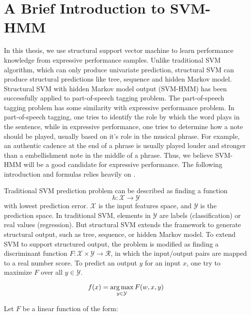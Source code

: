 \section{A Brief Introduction to SVM-HMM}
\label{sec:svm-hmm}
In this thesis, we use structural support vector machine to learn performance knowledge from expressive performance samples. Unlike traditional SVM algorithm, which can only produce univariate prediction, structural SVM can produce structural predictions like tree, sequence and hidden Markov model. Structural SVM with hidden Markov model output (SVM-HMM) has been successfully applied to part-of-speech tagging problem\cite{svm2009}. The part-of-speech tagging problem has some similarity with expressive performance problem. In part-of-speech tagging, one tries to identify the role by which the word plays in the sentence, while in expressive performance, one tries to determine how a note should be played, usually based on it's role in the musical phrase. For example, an authentic cadence at the end of a phrase is usually played louder and stronger than a embellishment note in the middle of a phrase. Thus, we believe SVM-HMM will be a good candidate for expressive performance. The following introduction and formulas relies heavily on \cite{svm2009, svm2005, svm2003}.


Traditional SVM prediction problem can be described as finding a function 
$$h: \mathcal{X \rightarrow Y}$$ with lowest prediction error. $\mathcal{X}$ is the input features space, and $\mathcal{Y}$ is the prediction space. In traditional SVM, elements in $\mathcal{Y}$ are labels (classification) or real values (regression). But structural SVM extends the framework to generate structural output, such as tree, sequence, or hidden Markov model.
To extend SVM to support structured output, the problem is modified as finding a discriminant function $F: \mathcal{X} \times \mathcal{Y} \rightarrow \mathcal{R}$, in which the input/output pairs are mapped to a real number score. To predict an output $y$ for an input $x$, one try to maximize $F$ over all $y \in \mathcal{Y}$. 

$$f(x) = \operatorname*{arg\,max}_{y\in\mathcal{Y}} F(w,x,y)$$

Let $F$ be a linear function of the form:

